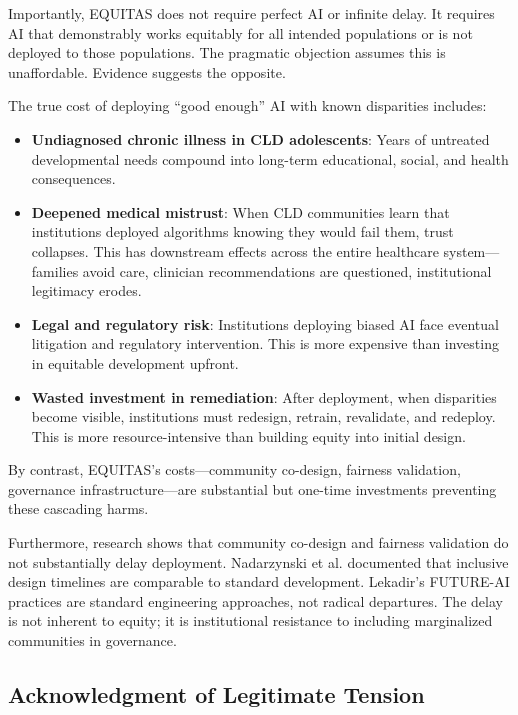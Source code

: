 \documentclass[12pt,a4paper]{article}
\begin{document}
Importantly, EQUITAS does not require perfect AI or infinite delay. It requires AI that demonstrably works equitably for all intended populations or is not deployed to those populations. The pragmatic objection assumes this is unaffordable. Evidence suggests the opposite.

The true cost of deploying ``good enough'' AI with known disparities includes:

\begin{itemize}
\item \textbf{Undiagnosed chronic illness in CLD adolescents}: Years of untreated developmental needs compound into long-term educational, social, and health consequences.

\item \textbf{Deepened medical mistrust}: When CLD communities learn that institutions deployed algorithms knowing they would fail them, trust collapses. This has downstream effects across the entire healthcare system---families avoid care, clinician recommendations are questioned, institutional legitimacy erodes.

\item \textbf{Legal and regulatory risk}: Institutions deploying biased AI face eventual litigation and regulatory intervention. This is more expensive than investing in equitable development upfront.

\item \textbf{Wasted investment in remediation}: After deployment, when disparities become visible, institutions must redesign, retrain, revalidate, and redeploy. This is more resource-intensive than building equity into initial design.
\end{itemize}

By contrast, EQUITAS's costs---community co-design, fairness validation, governance infrastructure---are substantial but one-time investments preventing these cascading harms.

Furthermore, research shows that community co-design and fairness validation do not substantially delay deployment. Nadarzynski et al. documented that inclusive design timelines are comparable to standard development. Lekadir's FUTURE-AI practices are standard engineering approaches, not radical departures. The delay is not inherent to equity; it is institutional resistance to including marginalized communities in governance.

\subsection{Acknowledgment of Legitimate Tension}
\end{document}
